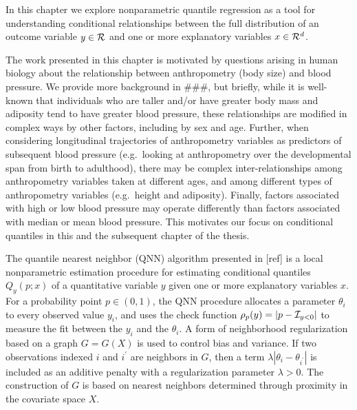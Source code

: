 In this chapter we explore nonparametric quantile regression as a tool for
understanding conditional relationships between the full distribution of
an outcome variable $y\in {\cal R}$ and one or more explanatory variables
$x \in {\cal R}^d$.

The work presented in this chapter is motivated by questions arising in
human biology about the relationship between anthropometry (body size)
and blood pressure.  We provide more background in ###, but briefly,
while it is well-known that individuals who are taller and/or have
greater body mass and adiposity tend to have greater blood pressure,
these relationships are modified in complex ways by other factors,
including by sex and age.  Further, when considering longitudinal
trajectories of anthropometry variables as predictors of subsequent blood
pressure (e.g.\ looking at anthropometry over the developmental span
from birth to adulthood), there may be complex inter-relationships among
anthropometry variables taken at different ages, and among different types
of anthropometry variables (e.g.\ height and adiposity).  Finally, factors
associated with high or low blood pressure may operate differently than
factors associated with median or mean blood pressure.  This motivates
our focus on conditional quantiles in this and the subsequent chapter
of the thesis.

The quantile nearest neighbor (QNN) algorithm presented in [ref] is
a local nonparametric estimation procedure for estimating conditional
quantiles $Q_y(p; x)$ of a quantitative variable $y$ given one or more
explanatory variables $x$.  For a probability point $p \in (0, 1)$, the
QNN procedure allocates a parameter $\theta_i$ to every observed value
$y_i$, and uses the check function $\rho_p(y) = |p - {\cal I}_{y<0}|$
to measure the fit between the $y_i$ and the $\theta_i$.  A form of
neighborhood regularization based on a graph $G = G(X)$ is used to control
bias and variance.  If two observations indexed $i$ and $i^\prime$ are
neighbors in $G$, then a term $\lambda |\theta_i - \theta_{i^\prime}|$
is included as an additive penalty with a regularization parameter
$\lambda > 0$.  The construction of $G$ is based on nearest neighbors
determined through proximity in the covariate space $X$.

